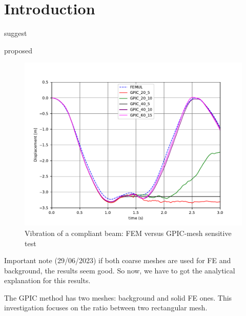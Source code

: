 \documentclass[preprint,3p,12pt]{elsarticle}
\begin{document}
\linenumbers

\section{Introduction}

\citep{Coombs:CMAME2020a} suggest

\cite{Murakami2001} proposed

\label{sec:1}
\begin{figure}[h!]
	\centering 
	\includegraphics[width=1.0\textwidth]{vibratingbeamGPIC.pdf}
	\caption{Vibration of a compliant beam: FEM versus GPIC-mesh sensitive test}
	\label{Fig1}
\end{figure}

Important note (29/06/2023) if both coarse meshes are used for FE and background, the results seem good. So now, we have to got the analytical explanation for this results. 

The GPIC method has two meshes: background and solid FE ones. This investigation focuses on the ratio between two rectangular mesh.



\end{document}
